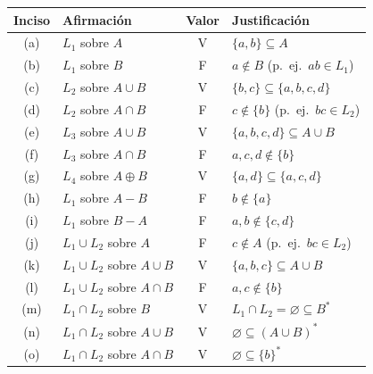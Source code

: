 \begin{center}
    \renewcommand{\arraystretch}{1.25}
    \begin{tabular}{|c|l|c|l|}
        \hline
        \textbf{Inciso} & \textbf{Afirmación} & \textbf{Valor} & \textbf{Justificación} \\
        \hline
        (a) & $L_1$ sobre $A$ & V & $\{a,b\} \subseteq A$ \\
        (b) & $L_1$ sobre $B$ & F & $a \notin B$ (p.\ ej.\ $ab \in L_1$) \\
        (c) & $L_2$ sobre $A \cup B$ & V & $\{b,c\} \subseteq \{a,b,c,d\}$ \\
        (d) & $L_2$ sobre $A \cap B$ & F & $c \notin \{b\}$ (p.\ ej.\ $bc \in L_2$) \\
        (e) & $L_3$ sobre $A \cup B$ & V & $\{a,b,c,d\} \subseteq A \cup B$ \\
        (f) & $L_3$ sobre $A \cap B$ & F & $a, c, d \notin \{b\}$ \\
        (g) & $L_4$ sobre $A \oplus B$ & V & $\{a,d\} \subseteq \{a,c,d\}$ \\
        (h) & $L_1$ sobre $A - B$ & F & $b \notin \{a\}$ \\
        (i) & $L_1$ sobre $B - A$ & F & $a, b \notin \{c,d\}$ \\
        (j) & $L_1 \cup L_2$ sobre $A$ & F & $c \notin A$ (p.\ ej.\ $bc \in L_2$) \\
        (k) & $L_1 \cup L_2$ sobre $A \cup B$ & V & $\{a,b,c\} \subseteq A \cup B$ \\
        (l) & $L_1 \cup L_2$ sobre $A \cap B$ & F & $a, c \notin \{b\}$ \\
        (m) & $L_1 \cap L_2$ sobre $B$ & V & $L_1 \cap L_2 = \varnothing \subseteq B^*$ \\
        (n) & $L_1 \cap L_2$ sobre $A \cup B$ & V & $\varnothing \subseteq (A \cup B)^*$ \\
        (o) & $L_1 \cap L_2$ sobre $A \cap B$ & V & $\varnothing \subseteq \{b\}^*$ \\
        \hline
    \end{tabular}
\end{center}